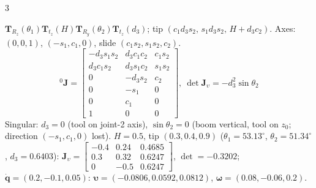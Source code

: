 \begin{multicols}{3}
\begin{fbx}
\end{fbx}
\begin{fbx}
$\mathbf T_{R_z}(\theta_1)\mathbf T_{t_z}(H)\mathbf T_{R_y}(\theta_2)\mathbf T_{t_z}(d_3)$; tip $(c_1d_3s_2,\,s_1d_3s_2,\,H{+}d_3c_2)$. Axes: $(0,0,1)$, $(-s_1,c_1,0)$, slide $(c_1s_2,s_1s_2,c_2)$.
\[{}^0\mathbf J=\begin{bmatrix}-d_3s_1s_2&d_3c_1c_2&c_1s_2\\d_3c_1s_2&d_3s_1c_2&s_1s_2\\0&-d_3s_2&c_2\\0&-s_1&0\\0&c_1&0\\1&0&0\end{bmatrix},\ \det\mathbf J_\upsilon=-d_3^2\sin\theta_2\]
Singular: $d_3=0$ (tool on joint-2 axis), $\sin\theta_2=0$ (boom vertical, tool on $z_0$; direction $(-s_1,c_1,0)$ lost). $H=0.5$, tip $(0.3,0.4,0.9)$ ($\theta_1=53.13^\circ$, $\theta_2=51.34^\circ$, $d_3=0.6403$): $\mathbf J_\upsilon=\begin{bmatrix}-0.4&0.24&0.4685\\0.3&0.32&0.6247\\0&-0.5&0.6247\end{bmatrix}$, $\det=-0.3202$; $\dot{\mathbf q}=(0.2,-0.1,0.05)$: $\boldsymbol\upsilon=(-0.0806,0.0592,0.0812)$, $\boldsymbol\omega=(0.08,-0.06,0.2)$.
\end{fbx}


\end{multicols}

